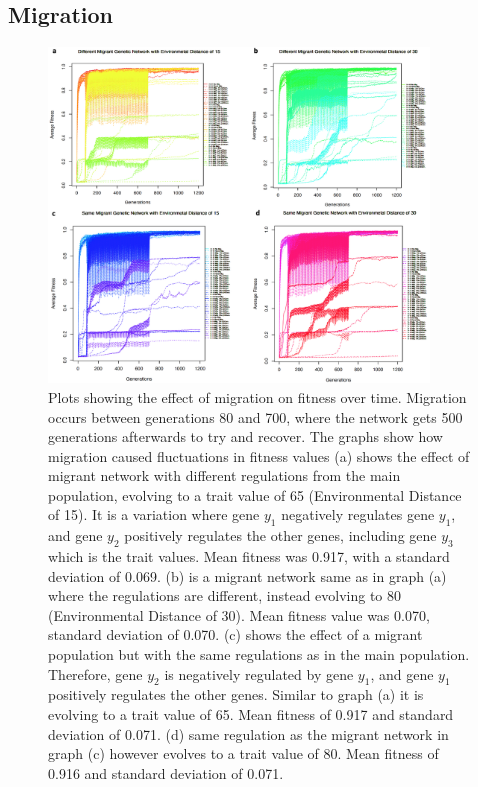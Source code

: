 \subsection{Migration}
\begin{figure}[h]
    \centering
        \includegraphics[width=0.9\textwidth]{../Results/migration.jpg}
    \caption{Plots showing the effect of migration on fitness over time. Migration occurs between generations 80 and 700, where the network gets 500 generations afterwards to try and recover. The graphs show how migration caused fluctuations in fitness values (a) shows the effect of migrant network with different regulations from the main population, evolving to a trait value of 65 (Environmental Distance of 15). It is a variation where gene $y_1$ negatively regulates gene $y_1$, and gene $y_2$ positively regulates the other genes, including gene $y_3$ which is the trait values. Mean fitness was 0.917, with a standard deviation of 0.069. (b) is a migrant network same as in graph (a) where the regulations are different, instead evolving to 80 (Environmental Distance of 30). Mean fitness value was 0.070, standard deviation of 0.070. (c) shows the effect of a migrant population but with the same regulations as in the main population. Therefore, gene $y_2$ is negatively regulated by gene $y_1$, and gene $y_1$ positively regulates the other genes. Similar to graph (a) it is evolving to a trait value of 65. Mean fitness of 0.917 and standard deviation of 0.071. (d) same regulation as the migrant network in graph (c) however evolves to a trait value of 80. Mean fitness of 0.916 and standard deviation of 0.071.}
    \label{fig:With Migration}
\end{figure}
